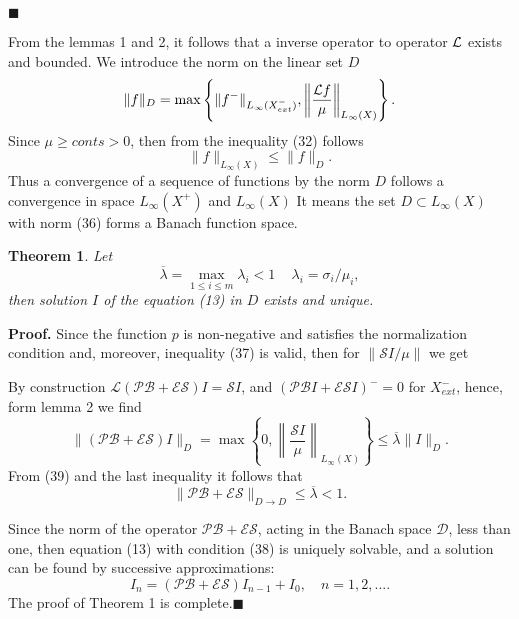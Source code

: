 \documentclass[12pt,reqno]{report}
\newtheorem{theorem}{Theorem}
\begin{document}
$\blacksquare$

From the lemmas 1 and 2, it follows that a inverse operator to operator ${\cal L}$ exists and bounded.
We introduce the norm on the linear set $D$
\begin{equation}
\|f\|_{D}= \max \left \{\|f^-\|_{L_{\infty}(X^-_{ext})},\left \|\frac{{\cal L}
	f}{\mu} \right\|_{L_{\infty}(X)}\right\}.
\end{equation}
Since $\mu \geq conts >0$, then from the inequality (32) follows
\begin{equation}
\|f\|_{L_{\infty}(X)} \leq \|f\|_{D}.
\end{equation}
Thus a convergence of a sequence of functions by the norm $D$ 
follows a convergence in space $L_{\infty}(X^+)$ and $L_{\infty}(X)$
It means the set $D \subset L_{\infty}(X)$ with norm (36) forms a Banach function space.

\begin{theorem}
	Let
	\begin{equation}
	\overline{\lambda} = \max \limits_{1\leq i\leq m} \lambda_i
	<1\,\quad \lambda_i = \sigma_i/\mu_i,
	\end{equation}
	then solution $I$ of the equation (13) in $D$ exists and unique.
\end{theorem}

{\bf Proof.} Since the function $p$ is non-negative and
satisfies the normalization condition and, moreover, 
inequality (37) is valid, then for $\|\mathcal S I/\mu \|$ we get

By construction $\mathcal L (\mathcal P \mathcal B + \mathcal E
\mathcal S) I = \mathcal S I$, and $(\mathcal P \mathcal B I +
\mathcal E \mathcal S I)^- =0$ for $X^-_{ext}$, hence, form lemma 2 we find
$$
\|(\mathcal P \mathcal B + \mathcal E \mathcal S) I\|_{D} = \max
\left\{ 0, \left \| \frac{\mathcal S I}{\mu} \right \|_{L_{\infty}(X)}
\right\} \leq \overline{\lambda} \|I\|_{D}.
$$
From (39) and the last inequality it follows that
$$
\|\mathcal P \mathcal B + \mathcal E \mathcal S\|_{D \to D} \leq
\overline{\lambda} <1.
$$

Since the norm of the operator $\mathcal P \mathcal B + \mathcal E
\mathcal S$, acting in the Banach space $\mathcal{D}$,
less than one, then equation (13) with condition (38) is
uniquely solvable, and a solution can be found by
successive approximations:
$$
I_n =(\mathcal P \mathcal B + \mathcal E \mathcal S)I_{n-1} +I_0,
\quad n=1,2,....
$$
The proof of Theorem 1 is complete.$\blacksquare$
\end{document}
